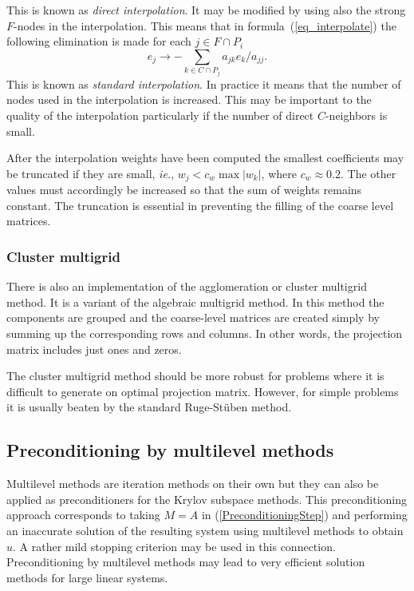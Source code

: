 \begin{versiona}
This is known as {\em direct interpolation}. It may be modified by using also 
the strong $F$-nodes in the interpolation. This means that 
in formula~(\ref{eq_interpolate}) the following 
elimination is made for each $j \in F \cap P_i$
\begin{equation}
  e_j \rightarrow - \sum_{k \in C \cap P_j} a_{jk}e_k/a_{jj} .
\end{equation}
This is known as {\em standard interpolation}.
In practice it means that the number of nodes used in the interpolation
is increased. This may be important to the quality of the interpolation 
particularly if the number of direct $C$-neighbors is small.

After the interpolation weights have been computed the smallest 
coefficients may be truncated if they are small, {\em ie.},
$w_j < c_w \max | w_k | $, where $c_w \approx 0.2$.
The other values must accordingly be increased so that the sum of weights
remains constant.
The truncation is essential in preventing the 
filling of the coarse level matrices.

\subsubsection*{Cluster multigrid}
There is also an implementation of the agglomeration or cluster multigrid method. 
It is a variant of the algebraic multigrid method. In this method the components are
grouped and the coarse-level matrices are created simply by summing up the corresponding 
rows and columns. In other words, the projection matrix includes just ones and zeros. 

The cluster multigrid method should be more robust for problems where it is difficult to
generate on optimal projection matrix. However, for simple problems it is usually beaten 
by the standard Ruge-St{\"u}ben method.



\subsubsection*{}

\subsection{Preconditioning by multilevel methods}\label{MultilevelPreconditioning}

Multilevel methods are iteration methods on their own but they can also be
applied as preconditioners for the Krylov subspace methods. 
This preconditioning approach corresponds to taking $M=A$ in (\ref{PreconditioningStep}) 
and performing an inaccurate solution of the resulting system using multilevel methods
to obtain $u$. A rather mild stopping criterion may be used in this connection. 
Preconditioning by multilevel methods may lead to very efficient solution methods for
large linear systems. 


\end{versiona}
